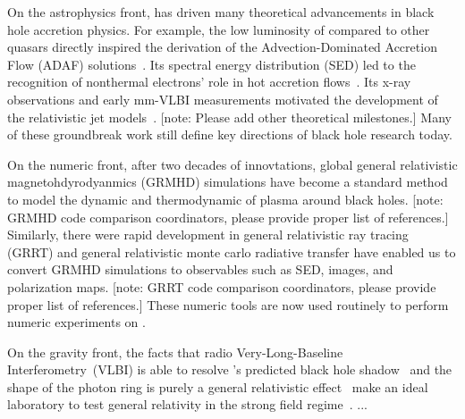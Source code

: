 \documentclass[twocolumn,tighten,dvipsnames,linenumbers]{aastex63}
\newcommand\note[1]{{\color{OliveGreen}[note: #1]}}
\begin{document}
On the astrophysics front, \sgra has driven many theoretical
advancements in black hole accretion physics.
For example, the low luminosity of \sgra compared to other quasars
directly inspired the derivation of the Advection-Dominated Accretion
Flow (ADAF) solutions~\citep{1994ApJ...428L..13N, 1995ApJ...444..231N,
  1995ApJ...452..710N, 1996A&AS..120C.287N, 1998ApJ...492..554N}.
Its spectral energy distribution (SED) led to the recognition of
nonthermal electrons' role in hot accretion
flows~\citep{2000ApJ...541..234O}.
Its x-ray observations and early mm-VLBI measurements motivated the
development of the relativistic jet models~\citep{2000A&A...362..113F,
  2004A&A...414..895F, 2005ApJ...635.1203M}.
\note{Please add other theoretical milestones.}
Many of these groundbreak work still define key directions of black
hole research today.

On the numeric front, after two decades of innovtations, global
general relativistic magnetohdyrodyanmics (GRMHD) simulations
\citep[e.g.,][]{2000ApJ...528..462H, 2003ApJ...589..458D,
  2003ApJ...589..444G, 2007CQGra..24S.235G, 2012ApJS..201....9F,
  2014ApJ...796...22F, 2016ApJS..225...22W, 2017ApJS..231...17A,
  2018JPhCS1031a2008O, 2019A&A...629A..61O, 2019ApJS..243...26P} have
become a standard method to model the dynamic and thermodynamic of
plasma around black holes.
\note{GRMHD code comparison coordinators, please provide proper list
  of references.}
Similarly, there were rapid development in general relativistic ray
tracing (GRRT) \citep[e.g.,][]{2009ApJ...696.1616D,
  2012ApJ...745....1P, 2013ApJ...777...11S, 2013ApJ...777...13C,
  2016MNRAS.462..115D, 2016ApJ...820..105P, 2018ApJ...867...59C,
  2018A&A...613A...2B, 2020ApJ...897..148G, 2020arXiv200703045B} and
general relativistic monte carlo radiative transfer
\citep{2009ApJS..184..387D, 2020MNRAS.491.4807M} have enabled us to
convert GRMHD simulations to observables such as SED, images, and
polarization maps.
\note{GRRT code comparison coordinators, please provide proper list of
  references.}
These numeric tools are now used routinely to perform numeric
experiments on \sgra.

On the gravity front, the facts that radio Very-Long-Baseline
Interferometry~(VLBI) is able to resolve \sgra's predicted black hole
shadow~\citep{2000ApJ...528L..13F} and the shape of the photon ring is
purely a general relativistic effect~\citep{2010ApJ...718..446J} make
\sgra an ideal laboratory to test general relativity in the strong
field regime~\citep{2010ApJ...718..446J, 2014ApJ...784....7B,
  2015ApJ...802...63B, 2015ApJ...814..115P, 2016ApJ...818..121P,
  2016PhRvL.117i1101J, 2019GReGr..51..137P}.
...
\end{document}
